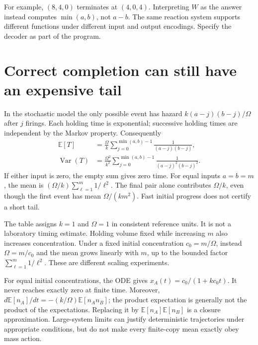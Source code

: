 For example, $(8,4,0)$ terminates at $(4,0,4)$. Interpreting $W$ as the
answer instead computes $\min(a,b)$, not $a-b$. The same reaction system
supports different functions under different input and output encodings.
Specify the decoder as part of the program.

\section{Correct completion can still have an expensive tail}

In the stochastic model the only possible event has hazard
$k(a-j)(b-j)/\Omega$ after $j$ firings. Each holding time is exponential;
successive holding times are independent by the Markov property. Consequently
\begin{align}
 \mathbb E[T]&=\frac{\Omega}{k}
 \sum_{j=0}^{\min(a,b)-1}\frac{1}{(a-j)(b-j)},\\
 \operatorname{Var}(T)&=\frac{\Omega^2}{k^2}
 \sum_{j=0}^{\min(a,b)-1}\frac{1}{(a-j)^2(b-j)^2}.
 \label{eq:timing}
\end{align}
If either input is zero, the empty sum gives zero time. For equal inputs
$a=b=m$, the mean is $(\Omega/k)\sum_{\ell=1}^m1/\ell^2$.
The final pair alone contributes $\Omega/k$, even though the first event
has mean $\Omega/(km^2)$. Fast initial progress does not certify a short tail.

\begin{center}\end{center}
The table assigns $k=1$ and $\Omega=1$ in consistent reference units. It is
not a laboratory timing estimate. Holding volume fixed while increasing $m$
also increases concentration. Under a fixed initial concentration
$c_0=m/\Omega$, instead $\Omega=m/c_0$ and the mean grows linearly with $m$,
up to the bounded factor $\sum_{\ell=1}^m1/\ell^2$. These are different
scaling experiments.


For equal initial concentrations, the ODE gives
$x_A(t)=c_0/(1+kc_0t)$. It never reaches exactly zero at finite time.
Moreover, $d\mathbb E[n_A]/dt=-(k/\Omega)\mathbb E[n_An_B]$;
the product expectation is generally not the product of the expectations.
Replacing it by $\mathbb E[n_A]\mathbb E[n_B]$ is a closure approximation.
Large-system limits can justify deterministic trajectories under appropriate
conditions, but do not make every finite-copy mean exactly obey mass action.

